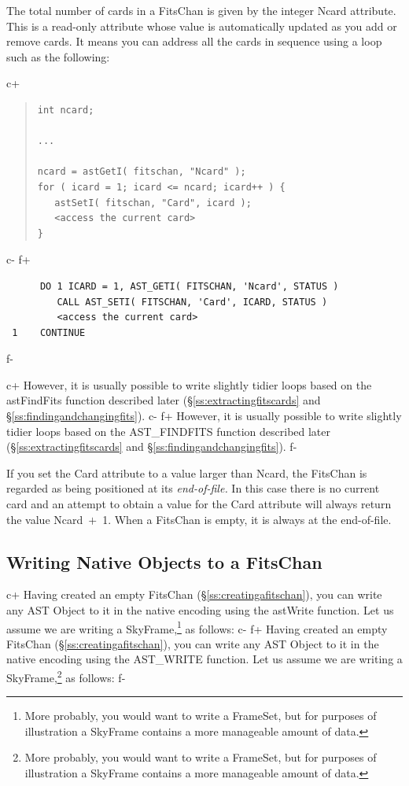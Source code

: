 \documentclass[twoside,11pt]{article}
\newcommand{\secref}[1]{\S\ref{#1}}
\newcommand{\secref}[1]{\ref{#1}}
\begin{document}
The total number of cards in a FitsChan is given by the integer Ncard
attribute. This is a read-only attribute whose value is automatically
updated as you add or remove cards. It means you can address all the
cards in sequence using a loop such as the following:

c+
\begin{quote}
\small
\begin{verbatim}
int ncard;

...

ncard = astGetI( fitschan, "Ncard" );
for ( icard = 1; icard <= ncard; icard++ ) {
   astSetI( fitschan, "Card", icard );
   <access the current card>
}
\end{verbatim}
\normalsize
\end{quote}
c-
f+
\small
\begin{verbatim}
      DO 1 ICARD = 1, AST_GETI( FITSCHAN, 'Ncard', STATUS )
         CALL AST_SETI( FITSCHAN, 'Card', ICARD, STATUS )
         <access the current card>
 1    CONTINUE
\end{verbatim}
\normalsize
f-

c+
However, it is usually possible to write slightly tidier loops based
on the astFindFits function described later
(\secref{ss:extractingfitscards} and
\secref{ss:findingandchangingfits}).
c-
f+
However, it is usually possible to write slightly tidier loops based
on the AST\_FINDFITS function described later
(\secref{ss:extractingfitscards} and
\secref{ss:findingandchangingfits}).
f-

If you set the Card attribute to a value larger than Ncard, the
FitsChan is regarded as being positioned at its {\em{end-of-file.}} In
this case there is no current card and an attempt to obtain a value
for the Card attribute will always return the value Ncard~$+$~1. When
a FitsChan is empty, it is always at the end-of-file.

\subsection{\label{ss:writingnativefits}Writing Native Objects to a FitsChan}

c+
Having created an empty FitsChan (\secref{ss:creatingafitschan}), you
can write any AST Object to it in the native encoding using the
astWrite function. Let us assume we are writing a
SkyFrame,\footnote{More probably, you would want to write a FrameSet,
but for purposes of illustration a SkyFrame contains a more manageable
amount of data.} as follows:
c-
f+
Having created an empty FitsChan (\secref{ss:creatingafitschan}), you
can write any AST Object to it in the native encoding using the
AST\_WRITE function. Let us assume we are writing a
SkyFrame,\footnote{More probably, you would want to write a FrameSet,
but for purposes of illustration a SkyFrame contains a more manageable
amount of data.} as follows:
f-
\end{document}
